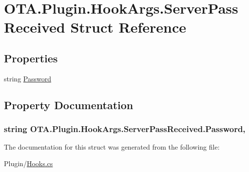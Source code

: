 \hypertarget{struct_o_t_a_1_1_plugin_1_1_hook_args_1_1_server_pass_received}{}\section{O\+T\+A.\+Plugin.\+Hook\+Args.\+Server\+Pass\+Received Struct Reference}
\label{struct_o_t_a_1_1_plugin_1_1_hook_args_1_1_server_pass_received}
\subsection*{Properties}
\begin{DoxyCompactItemize}
\item 
string \hyperlink{struct_o_t_a_1_1_plugin_1_1_hook_args_1_1_server_pass_received_a1fb69c342c48a415adc8015ebf0848a3}{Password}
\end{DoxyCompactItemize}


\subsection{Property Documentation}
\hypertarget{struct_o_t_a_1_1_plugin_1_1_hook_args_1_1_server_pass_received_a1fb69c342c48a415adc8015ebf0848a3}{}
\subsubsection[{Password}]{\setlength{\rightskip}{0pt plus 5cm}string O\+T\+A.\+Plugin.\+Hook\+Args.\+Server\+Pass\+Received.\+Password\hspace{0.3cm}{\ttfamily [get]}, {\ttfamily [set]}}\label{struct_o_t_a_1_1_plugin_1_1_hook_args_1_1_server_pass_received_a1fb69c342c48a415adc8015ebf0848a3}


The documentation for this struct was generated from the following file\+:\begin{DoxyCompactItemize}
\item 
Plugin/\hyperlink{_hooks_8cs}{Hooks.\+cs}\end{DoxyCompactItemize}
